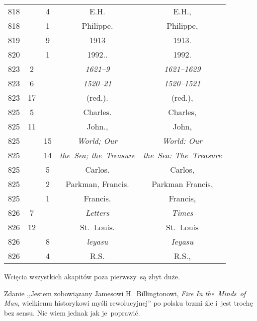 \documentclass[a4paper,11pt]{article}
\begin{document}
\begin{center}
\begin{tabular}{|c|c|c|c|c|}
    818 & &  4 & E.H. & E.H., \\
    818 & &  1 & Philippe. & Philippe, \\
    819 & &  9 & 1913 & 1913. \\
    820 & &  1 & 1992.. & 1992. \\
    823 &  2 & & \emph{1621--9} & \emph{1621--1629} \\
    823 &  6 & & \emph{1520--21} & \emph{1520--1521} \\
    823 & 17 & & (red.). & (red.), \\
    825 &  5 & & Charles. & Charles, \\
    825 & 11 & & John., & John, \\
    825 & & 15 & \emph{World; Our} & \emph{World: Our} \\
    825 & & 14 & \emph{the~Sea; the~Treasure} & \emph{the~Sea:
                                                The~Treasure} \\
    825 & &  5 & Carlos. & Carlos, \\
    825 & &  2 & Parkman, Francis. & Parkman Francis, \\
    825 & &  1 & Francis. & Francis, \\
    826 &  7 & & \emph{Letters} & \emph{Times} \\
    826 & 12 & & St.~Louis. & St.~Louis \\
    826 & &  8 & \emph{leyasu} & \emph{Ieyasu} \\
    826 & &  4 & R.S. & R.S., \\
    \hline
  \end{tabular}
\end{center}

\vspace{\spaceTwo}








\start {} Wcięcia wszystkich akapitów poza pierwszy~są zbyt
duże.

\vspace{\spaceFour}


\start {} Zdanie ,,Jestem zobowiązany Jamesowi
H.~Billingtonowi, \emph{Fire In the~Minds~of Man}, wielkiemu
historykowi myśli rewolucyjnej'' po polsku brzmi źle i~jest trochę bez
sensu. Nie wiem jednak jak je~poprawić.
\end{document}
